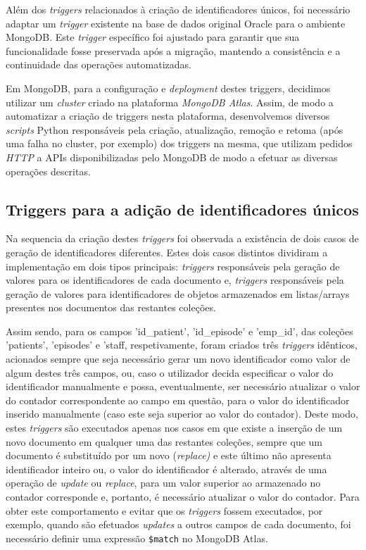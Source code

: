Além dos \textit{triggers} relacionados à criação de identificadores únicos, foi necessário adaptar um \textit{trigger} existente na base de dados original Oracle para o ambiente MongoDB. Este \textit{trigger} específico foi ajustado para garantir que sua funcionalidade fosse preservada após a migração, mantendo a consistência e a continuidade das operações automatizadas.

Em MongoDB, para a configuração e \textit{deployment} destes triggers, decidimos utilizar um \textit{cluster} criado na plataforma \textit{MongoDB Atlas}. Assim, de modo a automatizar a criação de triggers nesta plataforma, desenvolvemos diversos \textit{scripts} Python responsáveis pela criação, atualização, remoção e retoma (após uma falha no cluster, por exemplo) dos triggers na mesma, que utilizam pedidos \textit{HTTP} a APIs disponibilizadas pelo MongoDB de modo a efetuar as diversas operações descritas.


\subsection{Triggers para a adição de identificadores únicos}
Na sequencia da criação destes \textit{triggers} foi observada a existência de dois casos de geração de identificadores diferentes. Estes dois casos distintos dividiram a implementação em dois tipos principais: \textit{triggers} responsáveis pela geração de valores para os identificadores de cada documento e, \textit{triggers} responsáveis pela geração de valores para identificadores de objetos armazenados em listas/arrays presentes nos documentos das restantes coleções.

Assim sendo, para os campos 'id\_patient', 'id\_episode' e 'emp\_id', das coleções 'patients', 'episodes' e 'staff, respetivamente, foram criados três \textit{triggers} idênticos, acionados sempre que seja necessário gerar um novo identificador como valor de algum destes três campos, ou, caso o utilizador decida especificar o valor do identificador manualmente e possa, eventualmente, ser necessário atualizar o valor do contador correspondente ao campo em questão, para o valor do identificador inserido manualmente (caso este seja superior ao valor do contador). Deste modo, estes \textit{triggers} são executados apenas nos casos em que existe a inserção de um novo documento em qualquer uma das restantes coleções, sempre que um documento é substituído por um novo (\textit{replace)} e este último não apresenta identificador inteiro ou, o valor do identificador é alterado, através de uma operação de \textit{update} ou \textit{replace}, para um valor superior ao armazenado no contador corresponde e, portanto, é necessário atualizar o valor do contador. Para obter este comportamento e evitar que os \textit{triggers} fossem executados, por exemplo, quando são efetuados \textit{updates} a outros campos de cada documento, foi necessário definir uma expressão \texttt{\$match} no MongoDB Atlas.


